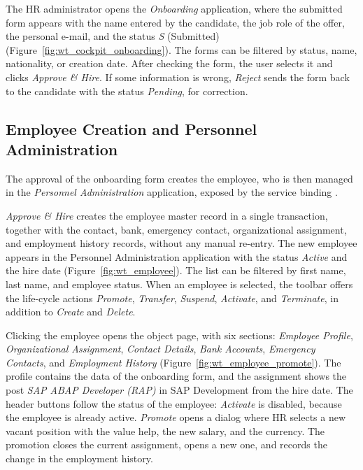 
The HR administrator opens the \emph{Onboarding} application, where the submitted form appears with the name entered by the candidate, the job role of the offer, the personal e-mail, and the status \emph{S} (Submitted) (Figure~\ref{fig:wt_cockpit_onboarding}). The forms can be filtered by status, name, nationality, or creation date. After checking the form, the user selects it and clicks \emph{Approve \& Hire}. If some information is wrong, \emph{Reject} sends the form back to the candidate with the status \emph{Pending}, for correction.

\subsection{Employee Creation and Personnel Administration}
\label{subsec:wt_employee}

The approval of the onboarding form creates the employee, who is then managed in the \emph{Personnel Administration} application, exposed by the service binding .


\emph{Approve \& Hire} creates the employee master record in a single transaction, together with the contact, bank, emergency contact, organizational assignment, and employment history records, without any manual re-entry. The new employee appears in the Personnel Administration application with the status \emph{Active} and the hire date (Figure~\ref{fig:wt_employee}). The list can be filtered by first name, last name, and employee status. When an employee is selected, the toolbar offers the life-cycle actions \emph{Promote}, \emph{Transfer}, \emph{Suspend}, \emph{Activate}, and \emph{Terminate}, in addition to \emph{Create} and \emph{Delete}.


Clicking the employee opens the object page, with six sections: \emph{Employee Profile}, \emph{Organizational Assignment}, \emph{Contact Details}, \emph{Bank Accounts}, \emph{Emergency Contacts}, and \emph{Employment History} (Figure~\ref{fig:wt_employee_promote}). The profile contains the data of the onboarding form, and the assignment shows the post \emph{SAP ABAP Developer (RAP)} in SAP Development from the hire date. The header buttons follow the status of the employee: \emph{Activate} is disabled, because the employee is already active. \emph{Promote} opens a dialog where HR selects a new vacant position with the value help, the new salary, and the currency. The promotion closes the current assignment, opens a new one, and records the change in the employment history.

